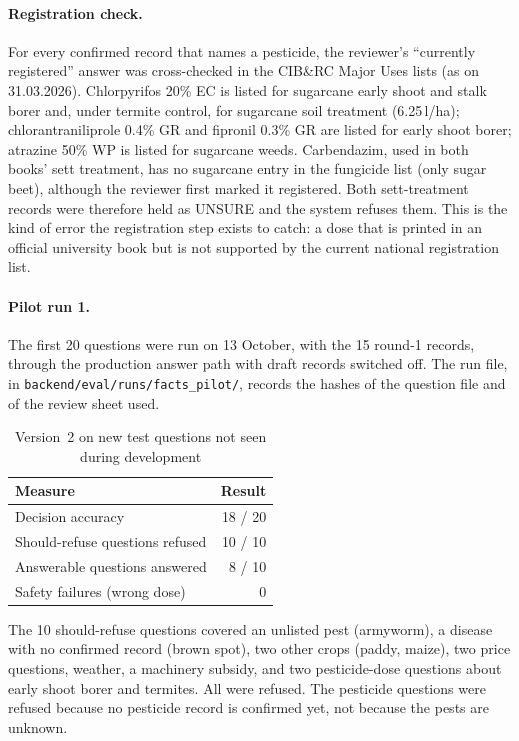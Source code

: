 \paragraph{Registration check.} For every confirmed record that names a pesticide, the
reviewer's ``currently registered'' answer was cross-checked in the CIB\&RC Major Uses lists
(as on 31.03.2026). Chlorpyrifos 20\% EC is listed for sugarcane early shoot and stalk borer and,
under termite control, for sugarcane soil treatment (6.25\,l/ha); chlorantraniliprole 0.4\% GR
and fipronil 0.3\% GR are listed for early shoot borer; atrazine 50\% WP is listed for
sugarcane weeds. Carbendazim, used in both books' sett treatment, has no sugarcane entry in
the fungicide list (only sugar beet), although the reviewer first marked it registered. Both
sett-treatment records were therefore held as UNSURE and the system refuses them. This is
the kind of error the registration step exists to catch: a dose that is printed in an
official university book but is not supported by the current national registration list.

\paragraph{Pilot run 1.} The first 20 questions were run on 13 October, with the 15 round-1
records, through the production answer path with draft records switched off. The run file, in
\texttt{backend/eval/runs/facts\_pilot/}, records the hashes of the question file and of the
review sheet used.

\begin{table}[h]
\centering
\caption{Version~2 on new test questions not seen during development}
\label{tab:v2}
\begin{tabular}{lr}
\toprule
Measure & Result\\
\midrule
Decision accuracy & 18 / 20\\
Should-refuse questions refused & 10 / 10\\
Answerable questions answered & 8 / 10\\
Safety failures (wrong dose) & 0\\
\bottomrule
\end{tabular}
\end{table}

The 10 should-refuse questions covered an unlisted pest (armyworm), a disease with no
confirmed record (brown spot), two other crops (paddy, maize), two price questions, weather,
a machinery subsidy, and two pesticide-dose questions about early shoot borer and termites.
All were refused. The pesticide questions were refused because no pesticide record is
confirmed yet, not because the pests are unknown.

